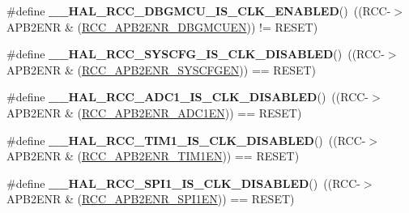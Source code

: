 \begin{DoxyCompactItemize}
\#define {\bfseries \+\_\+\+\_\+\+H\+A\+L\+\_\+\+R\+C\+C\+\_\+\+D\+B\+G\+M\+C\+U\+\_\+\+I\+S\+\_\+\+C\+L\+K\+\_\+\+E\+N\+A\+B\+L\+ED}()~((R\+CC-\/$>$A\+P\+B2\+E\+NR \& (\hyperlink{group___peripheral___registers___bits___definition_ga87db727052e2e14b12cb728ba978ebb8}{R\+C\+C\+\_\+\+A\+P\+B2\+E\+N\+R\+\_\+\+D\+B\+G\+M\+C\+U\+EN})) != R\+E\+S\+ET)
\item 
\mbox{\label{group___r_c_c___a_p_b2___peripheral___clock___enable___disable___status_ga9f32ce5d57fe1d7a4871552d2e9a5b0e}} 
\#define {\bfseries \+\_\+\+\_\+\+H\+A\+L\+\_\+\+R\+C\+C\+\_\+\+S\+Y\+S\+C\+F\+G\+\_\+\+I\+S\+\_\+\+C\+L\+K\+\_\+\+D\+I\+S\+A\+B\+L\+ED}()~((R\+CC-\/$>$A\+P\+B2\+E\+NR \& (\hyperlink{group___peripheral___registers___bits___definition_ga7a9d56a8aa1fa0f519ecbdf0d19dd4da}{R\+C\+C\+\_\+\+A\+P\+B2\+E\+N\+R\+\_\+\+S\+Y\+S\+C\+F\+G\+EN})) == R\+E\+S\+ET)
\item 
\mbox{\label{group___r_c_c___a_p_b2___peripheral___clock___enable___disable___status_gac9f006a3c1b75c06270f0ae5a2c3ed07}} 
\#define {\bfseries \+\_\+\+\_\+\+H\+A\+L\+\_\+\+R\+C\+C\+\_\+\+A\+D\+C1\+\_\+\+I\+S\+\_\+\+C\+L\+K\+\_\+\+D\+I\+S\+A\+B\+L\+ED}()~((R\+CC-\/$>$A\+P\+B2\+E\+NR \& (\hyperlink{group___peripheral___registers___bits___definition_ga57b9f50cb96a2e4ceba37728b4a32a42}{R\+C\+C\+\_\+\+A\+P\+B2\+E\+N\+R\+\_\+\+A\+D\+C1\+EN}))   == R\+E\+S\+ET)
\item 
\mbox{\label{group___r_c_c___a_p_b2___peripheral___clock___enable___disable___status_ga7116893adbb7fc144102af49de55350b}} 
\#define {\bfseries \+\_\+\+\_\+\+H\+A\+L\+\_\+\+R\+C\+C\+\_\+\+T\+I\+M1\+\_\+\+I\+S\+\_\+\+C\+L\+K\+\_\+\+D\+I\+S\+A\+B\+L\+ED}()~((R\+CC-\/$>$A\+P\+B2\+E\+NR \& (\hyperlink{group___peripheral___registers___bits___definition_ga25852ad4ebc09edc724814de967816bc}{R\+C\+C\+\_\+\+A\+P\+B2\+E\+N\+R\+\_\+\+T\+I\+M1\+EN}))   == R\+E\+S\+ET)
\item 
\mbox{\label{group___r_c_c___a_p_b2___peripheral___clock___enable___disable___status_gabd506be27916f029d2214e88bc48f6df}} 
\#define {\bfseries \+\_\+\+\_\+\+H\+A\+L\+\_\+\+R\+C\+C\+\_\+\+S\+P\+I1\+\_\+\+I\+S\+\_\+\+C\+L\+K\+\_\+\+D\+I\+S\+A\+B\+L\+ED}()~((R\+CC-\/$>$A\+P\+B2\+E\+NR \& (\hyperlink{group___peripheral___registers___bits___definition_gae08a3510371b9234eb96369c91d3552f}{R\+C\+C\+\_\+\+A\+P\+B2\+E\+N\+R\+\_\+\+S\+P\+I1\+EN}))   == R\+E\+S\+ET)

\end{DoxyCompactItemize}
